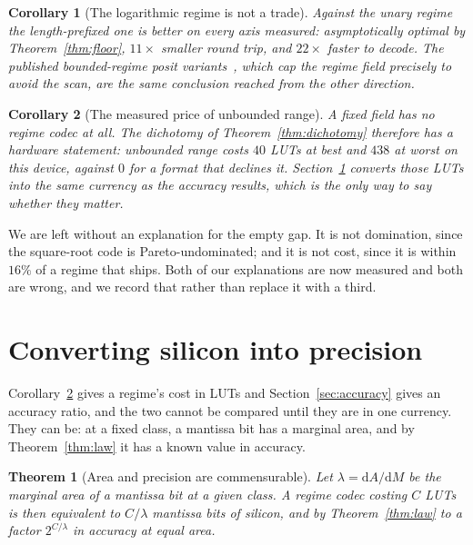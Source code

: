 \documentclass[11pt]{article}
\newtheorem{theorem}{Theorem}
\newtheorem{corollary}{Corollary}
\theoremstyle{definition}
\begin{document}
\begin{corollary}[The logarithmic regime is not a trade]
\label{cor:takumwins}
Against the unary regime the length-prefixed one is better on every axis measured:
asymptotically optimal by Theorem~\ref{thm:floor}, $11\times$ smaller round trip,
and $22\times$ faster to decode. The published bounded-regime posit
variants~\cite{positgap}, which cap the regime field precisely to avoid the scan,
are the same conclusion reached from the other direction.
\end{corollary}

\begin{corollary}[The measured price of unbounded range]
\label{cor:price}
A fixed field has no regime codec at all. The dichotomy of
Theorem~\ref{thm:dichotomy} therefore has a hardware statement: unbounded range
costs $40$ LUTs at best and $438$ at worst on this device, against $0$ for a
format that declines it. Section~\ref{sec:convert} converts those LUTs into the
same currency as the accuracy results, which is the only way to say whether they
matter.
\end{corollary}

We are left without an explanation for the empty gap. It is not domination, since
the square-root code is Pareto-undominated; and it is not cost, since it is within
$16\%$ of a regime that ships. Both of our explanations are now measured and both
are wrong, and we record that rather than replace it with a third.


\section{Converting silicon into precision}\label{sec:convert}

Corollary~\ref{cor:price} gives a regime's cost in LUTs and Section~\ref{sec:accuracy}
gives an accuracy ratio, and the two cannot be compared until they are in one
currency. They can be: at a fixed class, a mantissa bit has a marginal area, and
by Theorem~\ref{thm:law} it has a known value in accuracy.

\begin{theorem}[Area and precision are commensurable]
\label{thm:convert}
Let $\lambda = \mathrm{d}A/\mathrm{d}M$ be the marginal area of a mantissa bit at
a given class. A regime codec costing $C$ LUTs is then equivalent to $C/\lambda$
mantissa bits of silicon, and by Theorem~\ref{thm:law} to a factor
$2^{C/\lambda}$ in accuracy at equal area.
\end{theorem}
\end{document}
